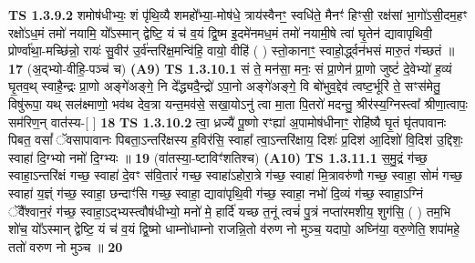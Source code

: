 \documentclass[17pt]{extarticle}
\begin{document}
                  \newline
                                \textbf{ TS 1.3.9.2} \newline
                  शमोष॑धीभ्यः॒ शं पृ॑थि॒व्यै शमहो᳚भ्या॒-मोष॑धे॒ त्राय॑स्वैनꣳ॒॒ स्वधि॑ते॒ मैनꣳ॑ हिꣳसी॒ रक्ष॑सां भा॒गो॑ऽसी॒दम॒हꣳ रक्षो॑ऽध॒मं तमो॑ नयामि॒ यो᳚ऽस्मान् द्वेष्टि॒ यं च॑ व॒यं द्वि॒ष्म इ॒दमे॑नमध॒मं तमो॑ नयामी॒षे त्वा॑ घृ॒तेन॑ द्यावापृथिवी॒ प्रोर्ण्वा॑था॒-मच्छि॑न्नो॒ रायः॑ सु॒वीर॑ उ॒र्व॑न्तरि॑क्ष॒मन्वि॑हि॒ वायो॒ वीहि॑ ( ) स्तो॒कानाꣳ॒॒ स्वाहो॒र्द्ध्वन॑भसं मारु॒तं ग॑च्छतं ॥ \textbf{  17} \newline
                  \newline
                      (अ॒द्भ्यो-वीहि॒-पञ्च॑ च)  \textbf{(A9)} \newline \newline
                                        \textbf{ TS 1.3.10.1} \newline
                  सं ते॒ मन॑सा॒ मनः॒ सं प्रा॒णेन॑ प्रा॒णो जुष्टं॑ दे॒वेभ्यो॑ ह॒व्यं घृ॒तव॒थ् स्वाहै॒न्द्रः प्रा॒णो अङ्गे॑अङ्गे॒ नि दे᳚द्ध्यदै॒न्द्रो॑ ऽपा॒नो अङ्गे॑अङ्गे॒ वि बो॑भुव॒द्देव॑ त्वष्ट॒र्भूरि॑ ते॒ सꣳस॑मेतु॒ विषु॑रूपा॒ यथ् सल॑क्ष्माणो॒ भव॑थ देव॒त्रा यन्त॒मव॑से॒ सखा॒योऽनु॑ त्वा मा॒ता पि॒तरो॑ मदन्तु॒ श्रीर॑स्य॒ग्निस्त्वा᳚ श्रीणा॒त्वापः॒ सम॑रिण॒न् वात॑स्य-[ ] \textbf{  18} \newline
                  \newline
                                \textbf{ TS 1.3.10.2} \newline
                  त्वा॒ ध्रज्यै॑ पू॒ष्णो रꣳह्या॑ अ॒पामोष॑धीनाꣳ॒॒ रोहि॑ष्यै घृ॒तं घृ॑तपावानः पिबत॒ वसां᳚ ॅवसापावानः पिबता॒ऽन्तरि॑क्षस्य ह॒विर॑सि॒ स्वाहा᳚ त्वा॒ऽन्तरि॑क्षाय॒ दिशः॑ प्र॒दिश॑ आ॒दिशो॑ वि॒दिश॑ उ॒द्दिशः॒ स्वाहा॑ दि॒ग्भ्यो नमो॑ दि॒ग्भ्यः ॥ \textbf{  19} \newline
                  \newline
                      (वा॑तस्या॒-ष्टाविꣳ॑शतिश्च)  \textbf{(A10)} \newline \newline
                                        \textbf{ TS 1.3.11.1} \newline
                  स॒मु॒द्रं ग॑च्छ॒ स्वाहा॒ऽन्तरि॑क्षं गच्छ॒ स्वाहा॑ दे॒वꣳ स॑वि॒तारं॑ गच्छ॒ स्वाहा॑ऽहोरा॒त्रे ग॑च्छ॒ स्वाहा॑ मि॒त्रावरु॑णौ गच्छ॒ स्वाहा॒ सोमं॑ गच्छ॒ स्वाहा॑ य॒ज्ञ्ं ग॑च्छ॒ स्वाहा॒ छन्दाꣳ॑सि गच्छ॒ स्वाहा॒ द्यावा॑पृथि॒वी ग॑च्छ॒ स्वाहा॒ नभो॑ दि॒व्यं ग॑च्छ॒ स्वाहा॒ऽग्निं ॅवै᳚श्वान॒रं ग॑च्छ॒ स्वाहा॒ऽद्भ्यस्त्वौष॑धीभ्यो॒ मनो॑ मे॒ हार्दि॑ यच्छ त॒नूं त्वचं॑ पु॒त्रं नप्ता॑रमशीय॒ शुग॑सि॒ ( ) तम॒भि शो॑च॒ यो᳚ऽस्मान् द्वेष्टि॒ यं च॑ व॒यं द्वि॒ष्मो धाम्नो॑धाम्नो राजन्नि॒तो व॑रुण नो मुञ्च॒ यदापो॒ अघ्नि॑या॒ वरु॒णेति॒ शपा॑महे॒ ततो॑ वरुण नो मुञ्च ॥ \textbf{  20 } \newline
\end{document}
